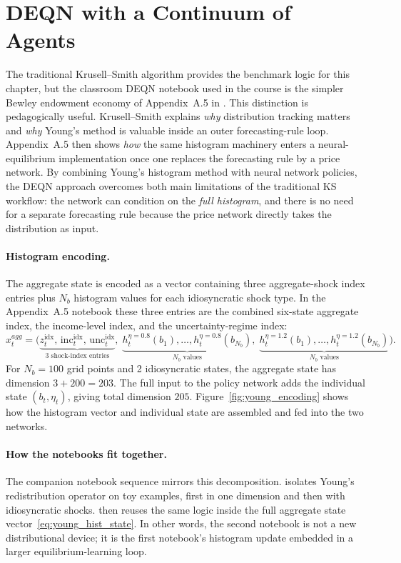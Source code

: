 \documentclass[11pt,a4paper]{report}
\begin{document}
\section{DEQN with a Continuum of Agents}
\label{sec:young_deqn}

The traditional Krusell--Smith algorithm provides the benchmark logic for this chapter, but the classroom DEQN notebook used in the course is the simpler Bewley endowment economy of Appendix~A.5 in \citet{azinovicDEEPEQUILIBRIUMNETS2022}.  This distinction is pedagogically useful.  Krusell--Smith explains \emph{why} distribution tracking matters and \emph{why} Young's method is valuable inside an outer forecasting-rule loop.  Appendix~A.5 then shows \emph{how} the same histogram machinery enters a neural-equilibrium implementation once one replaces the forecasting rule by a price network.  By combining Young's histogram method with neural network policies, the DEQN approach overcomes both main limitations of the traditional KS workflow: the network can condition on the \emph{full histogram}, and there is no need for a separate forecasting rule because the price network directly takes the distribution as input.

\paragraph{Histogram encoding.}
The aggregate state is encoded as a vector containing three aggregate-shock index entries plus $N_b$ histogram values for each idiosyncratic shock type.  In the Appendix~A.5 notebook these three entries are the combined six-state aggregate index, the income-level index, and the uncertainty-regime index:
\begin{equation}
x_t^{agg} = \bigl(\underbrace{z_t^{\mathrm{idx}},\,\mathrm{inc}_t^{\mathrm{idx}},\,\mathrm{unc}_t^{\mathrm{idx}}}_{3\text{ shock-index entries}},\; \underbrace{h_t^{\eta=0.8}(b_1),\ldots,h_t^{\eta=0.8}(b_{N_b})}_{N_b\text{ values}},\;\underbrace{h_t^{\eta=1.2}(b_1),\ldots,h_t^{\eta=1.2}(b_{N_b})}_{N_b\text{ values}}\bigr).
\label{eq:young_hist_state}
\end{equation}
For $N_b = 100$ grid points and 2 idiosyncratic states, the aggregate state has dimension $3 + 200 = 203$.  The full input to the policy network adds the individual state $(b_t, \eta_t)$, giving total dimension $205$.  Figure~\ref{fig:young_encoding} shows how the histogram vector and individual state are assembled and fed into the two networks.

\paragraph{How the notebooks fit together.}
The companion notebook sequence mirrors this decomposition.   isolates Young's redistribution operator on toy examples, first in one dimension and then with idiosyncratic shocks.   then reuses the same logic inside the full aggregate state vector~\eqref{eq:young_hist_state}.  In other words, the second notebook is not a new distributional device; it is the first notebook's histogram update embedded in a larger equilibrium-learning loop.
\end{document}
